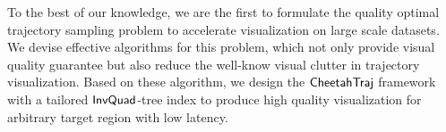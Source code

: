  To the best of our knowledge, we are the first to formulate the quality optimal trajectory sampling problem to accelerate visualization on large scale datasets. We devise effective algorithms for this problem, which not only provide visual quality guarantee but also reduce the well-know visual clutter in trajectory visualization. Based on these algorithm, we design the $\mathsf{CheetahTraj}$ framework with a tailored $\mathsf{InvQuad}$-tree index to produce high quality visualization for arbitrary target region with low latency.




%
